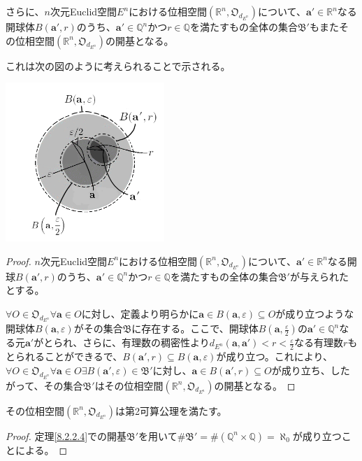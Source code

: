 \documentclass[dvipdfmx]{jsarticle}
\begin{document}
\begin{thm}\label{8.2.2.4}
さらに、$n$次元Euclid空間$E^{n}$における位相空間$\left( \mathbb{R}^{n},\mathfrak{O}_{d_{E^{n}}} \right)$について、$\mathbf{a}' \in \mathbb{R}^{n}$なる開球体$B\left( \mathbf{a}',r \right)$のうち、$\mathbf{a}' \in \mathbb{Q}^{n}$かつ$r \in \mathbb{Q}$を満たすもの全体の集合$\mathfrak{B}'$もまたその位相空間$\left( \mathbb{R}^{n},\mathfrak{O}_{d_{E^{n}}} \right)$の開基となる。
\end{thm}\par
これは次の図のように考えられることで示される。
\begin{center}
\includegraphics[width=60mm]{8.2.2.b.png}
\end{center}
\begin{proof}
$n$次元Euclid空間$E^{n}$における位相空間$\left( \mathbb{R}^{n},\mathfrak{O}_{d_{E^{n}}} \right)$について、$\mathbf{a}' \in \mathbb{R}^{n}$なる開球$B\left( \mathbf{a}',r \right)$のうち、$\mathbf{a}' \in \mathbb{Q}^{n}$かつ$r \in \mathbb{Q}$を満たすもの全体の集合$\mathfrak{B}'$が与えられたとする。\par
$\forall O \in \mathfrak{O}_{d_{E^{n}}}\forall\mathbf{a} \in O$に対し、定義より明らかに$\mathbf{a} \in B\left( \mathbf{a},\varepsilon \right) \subseteq O$が成り立つような開球体$B\left( \mathbf{a},\varepsilon \right)$がその集合$\mathfrak{B}$に存在する。ここで、開球体$B\left( \mathbf{a},\frac{\varepsilon}{2} \right)$の$\mathbf{a}' \in \mathbb{Q}^{n}$なる元$\mathbf{a}'$がとられ、さらに、有理数の稠密性より$d_{E^{n}}\left( \mathbf{a},\mathbf{a}' \right) < r < \frac{\varepsilon}{2}$なる有理数$r$もとられることができるで、$B\left( \mathbf{a}',r \right) \subseteq B\left( \mathbf{a},\varepsilon \right)$が成り立つ。これにより、$\forall O \in \mathfrak{O}_{d_{E^{n}}}\forall\mathbf{a} \in O\exists B\left( \mathbf{a}',\varepsilon \right) \in \mathfrak{B}'$に対し、$\mathbf{a} \in B\left( \mathbf{a}',r \right) \subseteq O$が成り立ち、したがって、その集合$\mathfrak{B}'$はその位相空間$\left( \mathbb{R}^{n},\mathfrak{O}_{d_{E^{n}}} \right)$の開基となる。
\end{proof}
\begin{thm}\label{8.2.2.5}
その位相空間$\left( \mathbb{R}^{n},\mathfrak{O}_{d_{E^{n}}} \right)$は第2可算公理を満たす。
\end{thm}
\begin{proof} 定理\ref{8.2.2.4}での開基$\mathfrak{B}'$を用いて${\#}\mathfrak{B}' = {\#}\left( \mathbb{Q}^{n} \times \mathbb{Q} \right) = \aleph_{0}$が成り立つことによる。
\end{proof}
\end{document}
